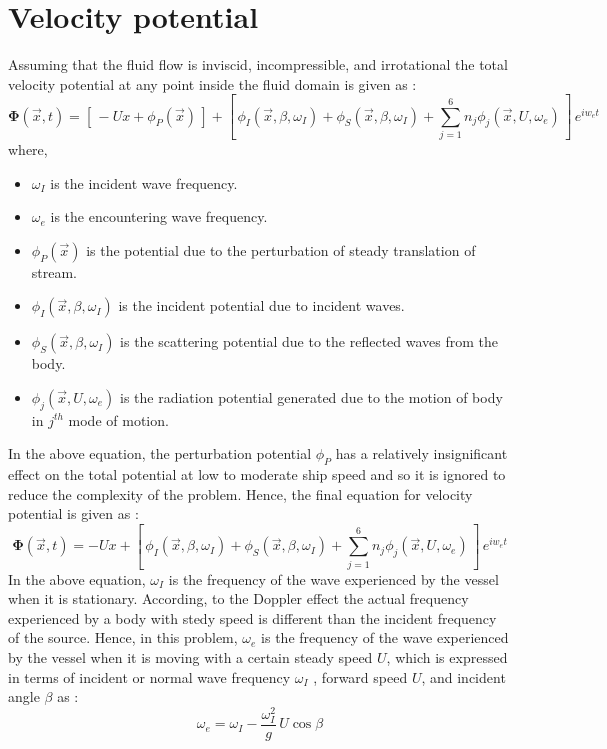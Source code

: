 \section{Velocity potential}
Assuming that the fluid flow is inviscid, incompressible, and irrotational the total velocity potential at any point inside the fluid domain is given as :
\begin{equation}
    \boldsymbol{\Phi} (\vec{x}, t) = [\, -Ux + \phi_P(\vec{x})\,] + [\, \phi_I(\vec{x}, \beta, \omega_I) + \phi_S(\vec{x}, \beta, \omega_I) + \sum_{j=1}^{6}n_j\phi_j(\vec{x}, U, \omega_e) \,]\, e^{i w_e t}
\end{equation}
where, 
\begin{itemize}
    \item $\omega_I$ is the incident wave frequency.
    \item $\omega_e$ is the encountering wave frequency.
    \item $\phi_P(\vec{x})$ is the potential due to the perturbation of steady translation of stream.
    \item $\phi_I(\vec{x}, \beta, \omega_I)$ is the incident potential due to incident waves.
    \item $\phi_S(\vec{x}, \beta, \omega_I)$ is the scattering potential due to the reflected 
    waves from the body.
    \item $\phi_j(\vec{x}, U, \omega_e)$ is the radiation potential generated due to the
    motion of body in $j^{th}$ mode of motion.
\end{itemize}
In the above equation, the perturbation potential $\phi_P$ has a relatively insignificant 
effect on the total 
potential at low to moderate ship speed and so it is ignored to reduce the complexity 
of the problem. Hence, the final equation for velocity potential is given as :
\begin{equation}
    \label{eq:velocity_potential}
    \boldsymbol{\Phi} (\vec{x}, t) = -Ux + [\, \phi_I(\vec{x}, \beta, \omega_I) + \phi_S(\vec{x}, 
    \beta, \omega_I) + \sum_{j=1}^{6}n_j\phi_j(\vec{x}, U, \omega_e) \,]\, e^{i w_e t}
\end{equation}
In the above equation, $\omega_I$ is the 
frequency of the wave experienced by the vessel when it is stationary. According,
to the Doppler effect the actual frequency experienced by a body with stedy speed is different 
than the incident frequency of the source. Hence, in this problem, $\omega_e$ is the frequency of 
the wave experienced by the vessel when it is moving with a 
certain steady speed $U$, which is expressed in terms of incident or normal wave 
frequency $\omega_I$ , forward speed $U$, and incident angle $\beta$ as :
\begin{equation}
    \label{eq:omega}
    \omega_e = \omega_I - \frac{\omega_I^2}{g}\,U\cos\beta
\end{equation}


